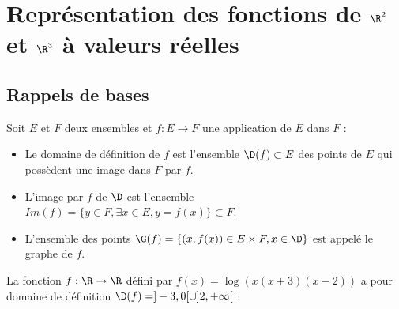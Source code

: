 \section{Représentation des fonctions de $\R^2$ et $\R^3$ à valeurs réelles}

\subsection{Rappels de bases}

\begin{definition}
	Soit $E$ et $F$ deux ensembles et  $f: E\to F$ une application de $E$ dans $F$ :
	\begin{itemize}
		\item Le domaine de définition de $f$ est l'ensemble $\D(f) \subset E$ des points de $E$ qui possèdent une image dans $F$ par $f$.
		\item L'image par $f$ de $\D$ est l'ensemble $Im(f) = \{ y\in F, \exists x\in E,  y = f(x)\} \subset F$.
		\item L'ensemble des points $\G(f) = \{(x, f(x))\in E \times F, x\in\D\}$ est appelé le graphe de $f$. %
	\end{itemize}
\end{definition}

\begin{exemple}
La fonction $f:\R \to \R$ défini par $f(x) = \log(x(x+3)(x-2))$ a pour domaine de définition $\D(f) = ]-3,0[ \cup ]2,+\infty[$ :
\end{exemple}


